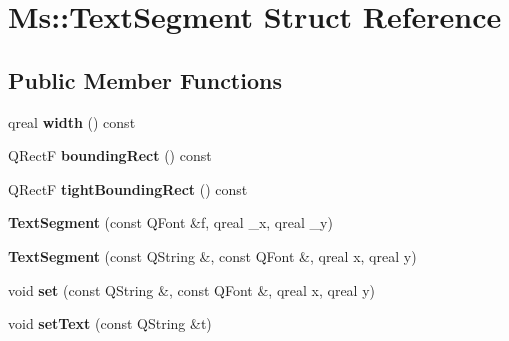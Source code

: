 \hypertarget{struct_ms_1_1_text_segment}{}\section{Ms\+:\+:Text\+Segment Struct Reference}
\label{struct_ms_1_1_text_segment}
\subsection*{Public Member Functions}
\begin{DoxyCompactItemize}
\item 
\mbox{\label{struct_ms_1_1_text_segment_ae1978327f224c7efaf9afea46b4824e7}} 
qreal {\bfseries width} () const
\item 
\mbox{\label{struct_ms_1_1_text_segment_a0b0e240cbcb4a4ba0b6c83843f5c8bf3}} 
Q\+RectF {\bfseries bounding\+Rect} () const
\item 
\mbox{\label{struct_ms_1_1_text_segment_ad2924a0629852176c0ecb9e688cb98b0}} 
Q\+RectF {\bfseries tight\+Bounding\+Rect} () const
\item 
\mbox{\label{struct_ms_1_1_text_segment_abe9369993f7508cc602f67eb8aa86ebc}} 
{\bfseries Text\+Segment} (const Q\+Font \&f, qreal \+\_\+x, qreal \+\_\+y)
\item 
\mbox{\label{struct_ms_1_1_text_segment_a372f7b9dbde3880dc67b338045255235}} 
{\bfseries Text\+Segment} (const Q\+String \&, const Q\+Font \&, qreal x, qreal y)
\item 
\mbox{\label{struct_ms_1_1_text_segment_a172d8872825f49582ca327a094f3add0}} 
void {\bfseries set} (const Q\+String \&, const Q\+Font \&, qreal x, qreal y)
\item 
\mbox{\label{struct_ms_1_1_text_segment_a62546b9c4f9c13e4c5b4e36afad8df18}} 
void {\bfseries set\+Text} (const Q\+String \&t)
\end{DoxyCompactItemize}

